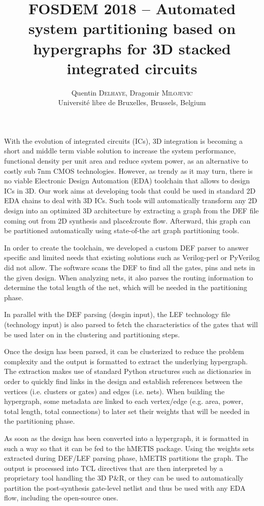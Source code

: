 \documentclass[a4paper,11pt]{article}
\title{\vspace*{-2cm}FOSDEM 2018 -- Automated system partitioning based on hypergraphs for 3D stacked integrated circuits}
\author{Quentin \textsc{Delhaye}, Dragomir \textsc{Milojevic} \\ 
Université libre de Bruxelles, Brussels, Belgium}
\date{}
\begin{document}
\maketitle
With the evolution of integrated circuits (ICs), 3D integration is becoming a short and middle term viable solution to increase the system performance, functional density per unit area and reduce system power, as an alternative to costly sub 7nm CMOS technologies. However, as trendy as it may turn, there is no viable Electronic Design Automation (EDA) toolchain that allows to design ICs in 3D. Our work aims at developing tools that could be used in standard 2D EDA chains to deal with 3D ICs. Such tools will automatically transform any 2D design into an optimized 3D architecture by extracting a graph from the DEF file coming out from 2D synthesis and place\&route flow. Afterward, this graph can be partitioned automatically using state-of-the art graph partitioning tools. 

In order to create the toolchain, we developed a custom DEF parser to answer specific and limited needs that existing solutions such as Verilog-perl or PyVerilog did not allow. The software scans the DEF to find all the gates, pins and nets in the given design. When analyzing nets, it also parses the routing information to determine the total length of the net, which will be needed in the partitioning phase.

In parallel with the DEF parsing (desgin input), the LEF technology file (technology input) is also parsed to fetch the characteristics of the gates that will be used later on in the clustering and partitioning steps.

Once the design has been parsed, it can be clusterized to reduce the problem complexity and the output is formatted to extract the underlying hypergraph.
The extraction makes use of standard Python structures such as dictionaries in order to quickly find links in the design and establish references between the vertices (i.e. clusters or gates) and edges (i.e. nets). When building the hypergraph, some metadata are linked to each vertex/edge (e.g. area, power, total length, total connections) to later set their weights that will be needed in the partitioning phase.

As soon as the design has been converted into a hypergraph, it is formatted in such a way so that it can be fed to the hMETIS package. Using the weights sets extracted during DEF/LEF parsing phase, hMETIS partitions the graph. The output is processed into  TCL directives that are then interpreted by a proprietary tool handling the 3D P\&R, or they can be used to automatically partition the post-synthesis gate-level netlist and thus be used with any EDA flow, including the open-source ones.
\end{document}
